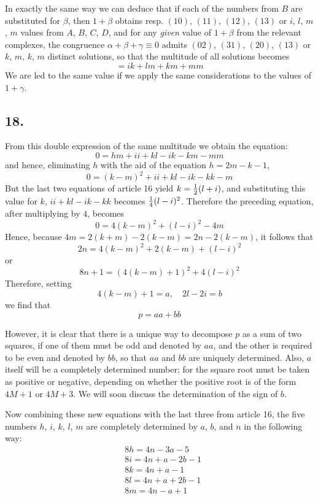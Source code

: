 \documentclass[twoside,12pt]{memoir}
\let\oldfrac\frac
\def\frac#1#2{\mathchoice{\tfrac{#1}{#2}}{\oldfrac{#1}{#2}}{\genfrac{}{}{}{2}{#1}{#2\mathstrut}}{\genfrac{}{}{}{3}{#1}{#2\mathstrut}}}
\begin{document}
In exactly the same way we can deduce that if each of the numbers from \(B\) are substituted for \(\beta\), then \(1+\beta\) obtains resp{.} \((10)\), \((11)\), \((12)\), \((13)\) or \(i\), \(l\), \(m\), \(m\) values from \(A\), \(B\), \(C\), \(D\), and for any \textit{given} value of \(1+\beta\) from the relevant complexes, the congruence \(\alpha+\beta+\gamma \equiv 0\) admits \((02)\), \((31)\), \((20)\), \((13)\) or \(k\), \(m\), \(k\), \(m\) distinct solutions, so that the multitude of all solutions becomes
\[=i k+l m+k m+m m\]
We are led to the same value if we apply the same considerations to the values of \(1+\gamma\).
%

\subsection*{18.}

From this double expression of the same multitude we obtain the equation:
\[0=h m+i i+k l-i k-k m-m m\]
and hence, eliminating \(h\) with the aid of the equation \(h=2 m-k-1\),
\[0=(k-m)^{2}+i i+k l-i k-k k-m\]
But the last two equations of article 16 yield \(k=\frac{1}{2}(l+i)\), and substituting this value for \(k\), \(i i+k l-i k-k k\) becomes \(\frac{1}{4}(l-i)^{2}\).  Therefore the preceding equation, after multiplying by \(4\), becomes
\[0=4(k-m)^{2}+(l-i)^{2}-4 m\]
Hence, because \(4 m=2(k+m)-2(k-m)=2 n-2(k-m)\), it follows that
\[2 n=4(k-m)^{2}+2(k-m)+(l-i)^{2}\]
or
\[8 n+1=(4(k-m)+1)^{2}+4(l-i)^{2}\]
Therefore, setting
\[4(k-m)+1=a,\quad 2 l-2 i=b\]
we find that
\[p=a a+b b\]
%

However, it is clear that there is a unique way to decompose \(p\) as a sum of two squares, if one of them must be odd and denoted by \(a a\), and the other is required to be even and denoted by \(b b\), so that \(a a\) and \(b b\) are uniquely determined.  Also, \(a\) itself will be a completely determined number; for the square root must be taken as positive or negative, depending on whether the positive root is of the form \(4 M+1\) or \(4 M+3\). We will soon discuss the determination of the sign of \(b\).
%

Now combining these new equations with the last three from article 16, the five numbers \(h\), \(i\), \(k\), \(l\), \(m\) are completely determined by \(a\), \(b\), and \(n\) in the following way:
\[\begin{aligned}
& 8 h=4 n-3 a-5 \\
& 8 i=4 n+a-2 b-1 \\
& 8 k=4 n+a-1 \\
& 8 l=4 n+a+2 b-1 \\
& 8 m=4 n-a+1
\end{aligned}\]
%
\end{document}
